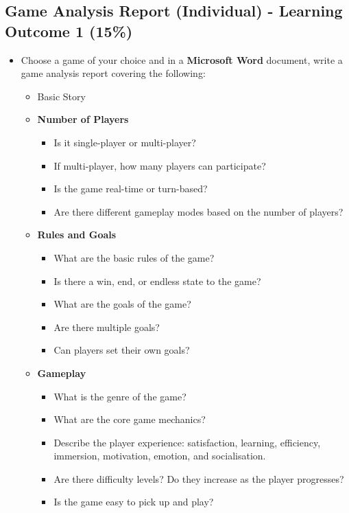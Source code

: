 \documentclass{article}
\begin{document}
\subsection*{Game Analysis Report (Individual) - Learning Outcome 1 (15\%)}
\begin{itemize}
	\item Choose a game of your choice and in a \textbf{Microsoft Word} document, write a game analysis report covering the following:
	\begin{itemize}
		\item Basic Story
	
		\item \textbf{Number of Players}
		\begin{itemize}
			\item Is it single-player or multi-player?
			\item If multi-player, how many players can participate?
			\item Is the game real-time or turn-based?
			\item Are there different gameplay modes based on the number of players?
		\end{itemize}
		
		\item \textbf{Rules and Goals}
		\begin{itemize}
			\item What are the basic rules of the game?
			\item Is there a win, end, or endless state to the game?
			\item What are the goals of the game?
			\item Are there multiple goals?
			\item Can players set their own goals?
		\end{itemize}
		
		\item \textbf{Gameplay}
		\begin{itemize}
			\item What is the genre of the game?
			\item What are the core game mechanics?
			\item Describe the player experience: satisfaction, learning, efficiency, immersion, motivation, emotion, and socialisation.
			\item Are there difficulty levels? Do they increase as the player progresses?
			\item Is the game easy to pick up and play?
		\end{itemize}
		

\end{itemize}
\end{itemize}
\end{document}
